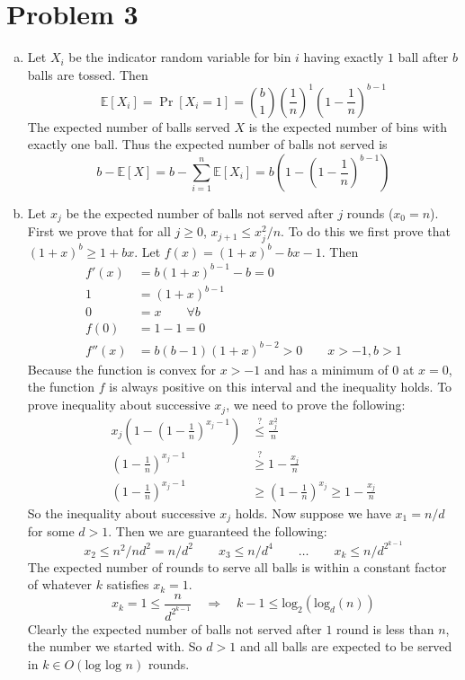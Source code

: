 \documentclass[11pt]{article}
\newcommand{\E}{\mathbb{E}}
\newcommand{\p}[1]{\left(#1\right)}
\newcommand{\logb}[2]{\text{log}_{#1}\p{#2}}
\newcommand{\asdf}{\newline\newline}
\begin{document}
\section*{Problem 3}
\begin{enumerate}[(a)]
\item Let $X_i$ be the indicator random variable for bin $i$ having exactly $1$ ball after $b$ balls are tossed. Then
$$\E[X_i]=\Pr[X_i=1]={b\choose1}\left(\frac1n\right)^1\left(1-\frac1n\right)^{b-1}$$
The expected number of balls served $X$ is the expected number of bins with exactly one ball. Thus the expected number of balls not served is
$$b-\E[X]=b-\sum_{i=1}^n\E[X_i]=b\left(1-\left(1-\frac1n\right)^{b-1}\right)$$
\item Let $x_j$ be the expected number of balls not served after $j$ rounds ($x_0=n$). First we prove that for all $j\geq0$, $x_{j+1}\leq x_j^2/n$. To do this we first prove that $(1+x)^b\geq1+bx$. Let $f(x)=(1+x)^b-bx-1$. Then \begin{align*}
f'(x) &= b(1+x)^{b-1}-b=0\\
1 &= (1+x)^{b-1}\\
0 &= x \qquad \forall b\\
f(0) &= 1-1=0\\
f''(x) &= b(b-1)(1+x)^{b-2} > 0 \qquad x>-1,b>1
\end{align*}
Because the function is convex for $x>-1$ and has a minimum of $0$ at $x=0$, the function $f$ is always positive on this interval and the inequality holds.\asdf
To prove inequality about successive $x_j$, we need to prove the following: \begin{align*}
x_j\left(1-\left(1-\frac1n\right)^{x_j-1}\right) &\stackrel{?}{\leq} \frac{x_j^2}n\\
\left(1-\frac1n\right)^{x_j-1} &\stackrel{?}{\geq} 1-\frac{x_j}n\\
\left(1-\frac1n\right)^{x_j-1} &\geq \left(1-\frac1n\right)^{x_j}\geq 1-\frac{x_j}n
\end{align*}
So the inequality about successive $x_j$ holds. Now suppose we have $x_1=n/d$ for some $d>1$. Then we are guaranteed the following:
$$x_2\leq n^2/nd^2=n/d^2 \qquad x_3\leq n/d^4 \qquad \ldots \qquad x_k\leq n/d^{2^{k-1}}$$
The expected number of rounds to serve all balls is within a constant factor of whatever $k$ satisfies $x_k=1$.
$$x_k=1\leq \frac n{d^{2^{k-1}}}\quad\Rightarrow\quad k-1\leq \logb2{\logb dn}$$
Clearly the expected number of balls not served after $1$ round is less than $n$, the number we started with. So $d>1$ and all balls are expected to be served in $k\in O(\text{log }\text{log }n)$ rounds.
\end{enumerate}
\end{document}
